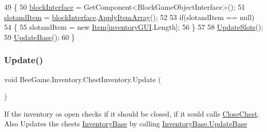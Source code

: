 \begin{DoxyCode}
49         \{
50             \hyperlink{class_bee_game_1_1_inventory_1_1_chest_inventory_aa18498b9af704585d4c747ff5a7444f8}{blockInterface} = GetComponent<BlockGameObjectInterface>();
51             \hyperlink{class_bee_game_1_1_inventory_1_1_inventory_base_a405502a6eabf14e1498d96dc8aff5e8d}{slotandItem} = \hyperlink{class_bee_game_1_1_inventory_1_1_chest_inventory_aa18498b9af704585d4c747ff5a7444f8}{blockInterface}.\hyperlink{class_bee_game_1_1_blocks_1_1_block_game_object_interface_a9e53e6213fec0b1f7a3ed16f50e3d894}{ApplyItemArray}();
52 
53             \textcolor{keywordflow}{if}(slotandItem == null)
54             \{
55                 slotandItem = \textcolor{keyword}{new} \hyperlink{struct_bee_game_1_1_items_1_1_item}{Item}[\hyperlink{class_bee_game_1_1_inventory_1_1_inventory_base_a48dcba7ad7bfa1bed8c9ae290fb32857}{inventoryGUI}.Length];
56             \}
57 
58             \hyperlink{class_bee_game_1_1_inventory_1_1_inventory_base_ac8edbffe8b164d66297c127654c844c4}{UpdateSlots}();
59             \hyperlink{class_bee_game_1_1_inventory_1_1_inventory_base_aa1a965cf7ba9e04b22a4ef85ad133854}{UpdateBase}();
60         \}
\end{DoxyCode}
\mbox{\label{class_bee_game_1_1_inventory_1_1_chest_inventory_ad2b02fa5934d7447cd236180435a4d0f}} 
\subsubsection{\texorpdfstring{Update()}{Update()}}
{\footnotesize\ttfamily void Bee\+Game.\+Inventory.\+Chest\+Inventory.\+Update (\begin{DoxyParamCaption}{ }\end{DoxyParamCaption})\hspace{0.3cm}{\ttfamily [private]}}



If the inventory os open checks if it should be closed, if it sould calls \hyperlink{class_bee_game_1_1_inventory_1_1_chest_inventory_a0a42c60f89a1c79ce2be4f23da86e7b6}{Close\+Chest}. Also Updates the chests \hyperlink{class_bee_game_1_1_inventory_1_1_inventory_base}{Inventory\+Base} by calling \hyperlink{class_bee_game_1_1_inventory_1_1_inventory_base_aa1a965cf7ba9e04b22a4ef85ad133854}{Inventory\+Base.\+Update\+Base} 



